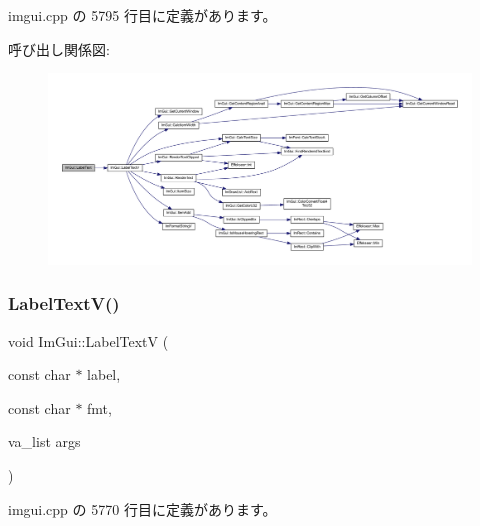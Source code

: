 imgui.\+cpp の 5795 行目に定義があります。

呼び出し関係図\+:\nopagebreak
\begin{figure}[H]
\begin{center}
\leavevmode
\includegraphics[width=350pt]{namespace_im_gui_ad92ccfbc33d448ff40cfcf9219177344_cgraph}
\end{center}
\end{figure}
\mbox{\label{namespace_im_gui_a55e5a7edb676a8f5cd7f65443138a8a0}} 
\subsubsection{\texorpdfstring{Label\+Text\+V()}{LabelTextV()}}
{\footnotesize\ttfamily void Im\+Gui\+::\+Label\+TextV (\begin{DoxyParamCaption}\item[{const char $\ast$}]{label,  }\item[{const char $\ast$}]{fmt,  }\item[{va\+\_\+list}]{args }\end{DoxyParamCaption})}



 imgui.\+cpp の 5770 行目に定義があります。

